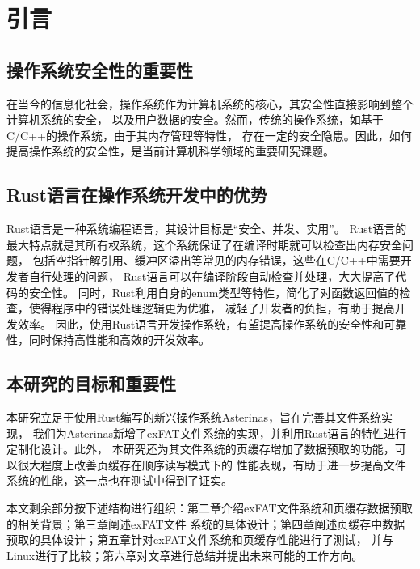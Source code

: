 
\chapter{引言}

\section{操作系统安全性的重要性}
在当今的信息化社会，操作系统作为计算机系统的核心，其安全性直接影响到整个计算机系统的安全，
以及用户数据的安全。然而，传统的操作系统，如基于C/C++的操作系统，由于其内存管理等特性，
存在一定的安全隐患。因此，如何提高操作系统的安全性，是当前计算机科学领域的重要研究课题。

\section{Rust语言在操作系统开发中的优势}
Rust语言是一种系统编程语言，其设计目标是“安全、并发、实用”。
Rust语言的最大特点就是其所有权系统，这个系统保证了在编译时期就可以检查出内存安全问题，
包括空指针解引用、缓冲区溢出等常见的内存错误，这些在C/C++中需要开发者自行处理的问题，
Rust语言可以在编译阶段自动检查并处理，大大提高了代码的安全性。
同时，Rust利用自身的enum类型等特性，简化了对函数返回值的检查，使得程序中的错误处理逻辑更为优雅，
减轻了开发者的负担，有助于提高开发效率。
因此，使用Rust语言开发操作系统，有望提高操作系统的安全性和可靠性，同时保持高性能和高效的开发效率。

\section{本研究的目标和重要性}
本研究立足于使用Rust编写的新兴操作系统Asterinas\parencite{Asterinas}，旨在完善其文件系统实现，
我们为Asterinas新增了exFAT文件系统\parencite{exFAT}的实现，并利用Rust语言的特性进行定制化设计。此外，
本研究还为其文件系统的页缓存增加了数据预取的功能，可以很大程度上改善页缓存在顺序读写模式下的
性能表现，有助于进一步提高文件系统的性能，这一点也在测试中得到了证实。

本文剩余部分按下述结构进行组织：第二章介绍exFAT文件系统和页缓存数据预取的相关背景；第三章阐述exFAT文件
系统的具体设计；第四章阐述页缓存中数据预取的具体设计；第五章针对exFAT文件系统和页缓存性能进行了测试，
并与Linux进行了比较；第六章对文章进行总结并提出未来可能的工作方向。



